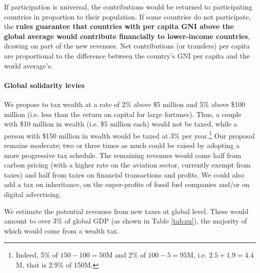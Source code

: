 \documentclass[12pt,english]{article}
\begin{document}
If participation is universal, the contributions would be returned to participating countries in proportion to their population. If some countries do not participate, 
the\textbf{ rules guarantee that countries with per capita GNI above the global average would contribute financially to lower-income countries}, drawing on part of the new revenues. Net contributions (or transfers) per capita are proportional to the difference between the country's GNI per capita and the world average's.

\paragraph{Global solidarity levies}
We propose to tax wealth at a rate of 2\% above \$5 million and 5\% above \$100 million (i.e. less than the return on capital for large fortunes). Thus, a couple with \$10 million in wealth (i.e. \$5 million each) would not be taxed, while a person with \$150 million in wealth would be taxed at 3\% per year.\footnote{Indeed, 5\% of $150 - 100 = 50$M and 2\% of $100 - 5 = 95$M, i.e. $2.5 + 1.9 = 4.4$M, that is 2.9\% of 150M.} 
Our proposal remains moderate; two or three times as much could be raised by adopting a more progressive tax schedule. The remaining revenues would come half from carbon pricing (with a higher rate on the aviation sector, currently exempt from taxes) and half from taxes on financial transactions and profits. 
We could also add a tax on inheritance, on the super-profits of fossil fuel companies and/or on digital advertising.\cite{acemoglu_urgent_2024} 

We estimate the potential revenues from new taxes at global level.\cite{fabre_shared_2024} These would amount to over 3\% of global GDP (as shown in Table \ref{tab:su}), the majority of which would come from a wealth tax. %
\end{document}
